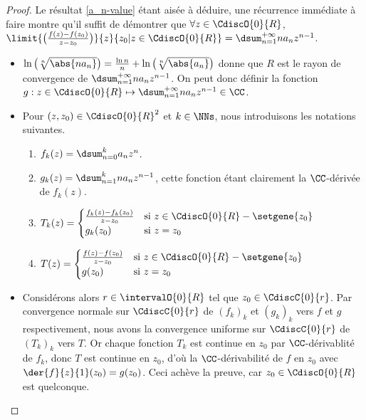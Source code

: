 \begin{proof}
	Le résultat \ref{a_n-value} étant aisée à déduire, une récurrence immédiate à faire montre qu'il suffit de démontrer que
	$\forall z \in \CdiscO{0}{R}$,
	$ \limit{\big( \frac{f(z) - f(z_0)}{z - z_0} \big)}%
	        {z}{z_0 | z \in \CdiscO{0}{R}}
	= \dsum_{n = 1}^{+\infty} n a_n z^{n - 1}$.
	\begin{itemize}
		\item
		$ \ln \big( \sqrt[n]{\abs{n a_n}} \big)
		= \frac{\ln n}{n} + \ln \big( \sqrt[n]{\abs{a_n}} \big)$
		donne que
		$R$ est le rayon de convergence de
		$\dsum_{n = 1}^{+\infty} n a_n z^{n - 1}$.
		On peut donc définir la fonction $g: z \in \CdiscO{0}{R} \mapsto \dsum_{n = 1}^{+\infty} n a_n z^{n - 1} \in \CC$.


		\item Pour $(z , z_0) \in \CdiscO{0}{R}^2$ et $k \in \NNs$, nous introduisons les notations suivantes.
        \begin{enumerate}[label=(\alph*)]
	        \item $f_k(z) = \dsum_{n = 0}^{k} a_n z^n$.

	        \item $g_k(z) = \dsum_{n = 1}^{k} n a_n z^{n-1}$,
	        cette fonction étant clairement la $\CC$-dérivée de $f_k(z)$.

	        \item $T_k(z) =
			\begin{cases}
	    		  \frac{f_k(z) - f_k(z_0)}{z - z_0}
				& \text{si $z \in \CdiscO{0}{R} - \setgene{z_0}$}
				\\
	   			  g_k(z_0) 
				& \text{si $z = z_0$}
	 		\end{cases}$

	        \item $T(z) =
			\begin{cases}
	    		  \frac{f(z) - f(z_0)}{z - z_0} 
				& \text{si $z \in \CdiscO{0}{R} - \setgene{z_0}$}
				\\
	   			  g(z_0)
				& \text{si $z = z_0$}
	 		\end{cases}$
	    \end{enumerate}


		\item Considérons alors $r \in \intervalO{0}{R}$ tel que $z_0 \in \CdiscC{0}{r}$.
		Par convergence normale sur $\CdiscC{0}{r}$ de $(f_k)_k$ et $(g_k)_k$ vers $f$ et $g$ respectivement,
		nous avons la convergence uniforme sur $\CdiscC{0}{r}$ de $(T_k)_k$ vers $T$. 
		Or chaque fonction $T_k$ est continue en $z_0$ par $\CC$-dérivablité de $f_k$, donc $T$ est continue en $z_0$,
		d'où
		la $\CC$-dérivabilité de  $f$ en $z_0$ avec $\der{f}{z}{1}(z_0) = g(z_0)$.
		Ceci achève la preuve, car $z_0 \in \CdiscO{0}{R}$ est quelconque.
	\end{itemize}

	\null\vspace{-6ex}
\end{proof}


